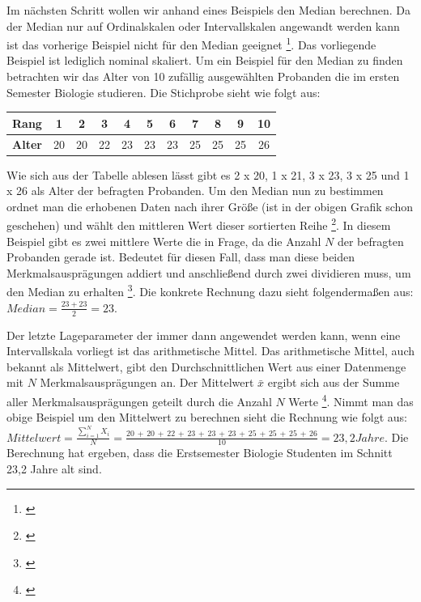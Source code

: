 Im nächsten Schritt wollen wir anhand eines Beispiels den Median berechnen. Da der Median nur auf Ordinalskalen oder Intervallskalen angewandt werden kann ist das vorherige Beispiel nicht für den Median geeignet \footnote{\cite[vgl.][52]{Fahrmeir2016}}. Das vorliegende Beispiel ist lediglich nominal skaliert.
Um ein Beispiel für den Median zu finden betrachten wir das Alter von 10 zufällig ausgewählten Probanden die im ersten Semester Biologie studieren. Die Stichprobe sieht wie folgt aus:
\begin{center}
\begin{tabular}{r|c|c|c|c|c|c|c|c|c|c} 
\textbf{Rang} & 1 & 2 & 3 & 4 & 5 & 6 & 7 & 8 & 9 & 10 \\ \hline
\textbf{Alter} & 20 & 20 & 22 & 23 & 23 & 23 & 25 & 25 & 25 & 26\\
\end{tabular}
\end{center}
Wie sich aus der Tabelle ablesen lässt gibt es 2 x 20, 1 x 21, 3 x 23, 3 x 25 und 1 x 26 als Alter der befragten Probanden. Um den Median nun zu bestimmen ordnet man die erhobenen Daten nach ihrer Größe (ist in der obigen Grafik schon geschehen) und wählt den mittleren Wert dieser sortierten Reihe \footnote{\cite[vgl.][52\psq]{Fahrmeir2016}}. In diesem Beispiel gibt es zwei mittlere Werte die in Frage, da die Anzahl $N$ der befragten Probanden gerade ist. Bedeutet für diesen Fall, dass man diese beiden Merkmalsausprägungen addiert und anschließend durch zwei dividieren muss, um den Median zu erhalten \footnote{\cite[vgl.][53]{Fahrmeir2016}}. Die konkrete Rechnung dazu sieht folgendermaßen aus: $Median = \frac{23 + 23}{2} = 23$.

Der letzte Lageparameter der immer dann angewendet werden kann, wenn eine Intervallskala vorliegt ist das arithmetische Mittel. Das arithmetische Mittel, auch bekannt als Mittelwert, gibt den Durchschnittlichen Wert aus einer Datenmenge mit $N$ Merkmalsausprägungen an. Der Mittelwert $\bar{x}$ ergibt sich aus der Summe aller Merkmalsausprägungen geteilt durch die Anzahl $N$ Werte \footnote{\cite[vgl.][49\psq]{Fahrmeir2016}}. Nimmt man das obige Beispiel um den Mittelwert zu berechnen sieht die Rechnung wie folgt aus: \\
$Mittelwert = \frac{\sum \limits_{i=1}^N X_i}{N} = \frac{20\,+\,20\,+\,22\,+\,23\,+\,23\,+\,23\,+\,25\,+\,25\,+\,25\,+\,26}{10} = 23,2 Jahre$. Die Berechnung hat ergeben, dass die Erstsemester Biologie Studenten im Schnitt 23,2 Jahre alt sind.



